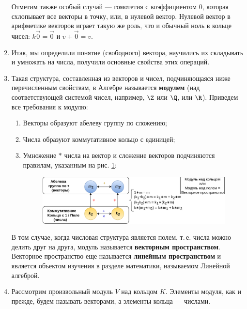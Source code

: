 \begin{enumerate}
Отметим также особый случай --- гомотетия с коэффициентом 0, которая схлопывает все векторы в точку, или, в нулевой вектор. Нулевой вектор в арифметике векторов играет такую же роль, что и обычный ноль в кольце чисел: $k\vec 0=\vec 0$ и $v+\vec 0=v$.

\item Итак, мы определили понятие (свободного) вектора, научились их складывать и умножать на числа, получили основные свойства этих операций. 
\item Такая структура, составленная из векторов и чисел, подчиняющаяся ниже перечисленным свойствам, в Алгебре называется \textbf{модулем} (над соответствующей системой чисел, например, $\Z$ или $\Q$, или $\R$). Приведем все требования к модулю:
\begin{enumerate}[\bf Mod1]
\item Векторы образуют абелеву группу по сложению;
\item Числа образуют коммутативное кольцо с единицей;
\item Умножение $*$ числа на вектор и сложение векторов подчиняются правилам, указанным на рис. \ref{ModuleOverRing}:

\begin{figure}[hbt!]
\begin{center}
\includegraphics[scale=0.3]{ModuleOverRing.png}
\end{center}\caption{}\label{ModuleOverRing}
\end{figure}
\end{enumerate}

В том случае, когда числовая структура является полем, т.\,е. числа можно делить друг на друга, модуль называется \textbf{векторным пространством}. Векторное пространство еще называется \textbf{линейным пространством} и является объектом изучения в разделе математики, называемом Линейной алгеброй.





\item Рассмотрим произвольный модуль $V$ над кольцом $K$. Элементы модуля, как и прежде, будем называть векторами, а элементы кольца --- числами.


\end{enumerate}
